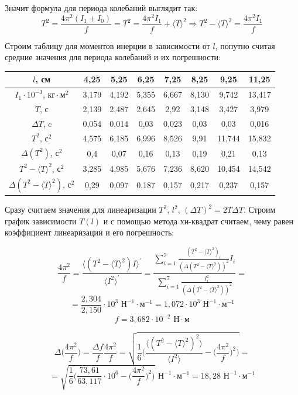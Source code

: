 \documentclass[a4paper, 12pt]{article} %
\begin{document}
Значит формула для периода колебаний выглядит так:
\[T^2 = \frac{4\pi^2 (I_1 + I_0)}{f} = T^2 = \frac{4\pi^2 I_1}{f} + \langle T \rangle^2 \Rightarrow T^2 - \langle T \rangle^2 = \frac{4\pi^2 I_1}{f}\]

Строим таблицу для моментов инерции в зависимости от $l$, попутно считая средние значения для периода колебаний и их погрешности:\\

\begin{center}
\begin{tabular}{|c|c|c|c|c|c|c|c|}
\hline 
$l$, см & 4,25 & 5,25 & 6,25 & 7,25 & 8,25 & 9,25 & 11,25 \\ 
\hline 
$I_1 \cdot 10^{-3}$, $\text{кг} \cdot \text{м}^2$  & 3,179 & 4,192 & 5,355 & 6,667 & 8,130 & 9,742 & 13,417 \\ 
\hline 
$T$, с & 2,139 & 2,487 & 2,645 & 2,92 & 3,148 & 3,427 & 3,979 \\ 
\hline 
$\Delta T$, c & 0,054 & 0,014 & 0,03 & 0,023 & 0,03 & 0,03 & 0,016 \\ 
\hline
$T^2$, $\text{с}^2$ & 4,575 & 6,185 & 6,996 & 8,526 & 9,91 & 11,744 & 15,832 \\ 
\hline 
$\Delta (T^2)$, $\text{с}^2$ & 0,4 & 0,07 & 0,16 & 0,13 & 0,19 & 0,21 & 0,13 \\ 
\hline 
$T^2 - \langle T \rangle^2$, $\text{с}^2$ & 3,285 & 4,985 & 5,676 & 7,236 & 8,620 & 10,454 & 14,542 \\ 
\hline 
$\Delta (T^2 - \langle T \rangle^2)$, $\text{с}^2$ & 0,29 & 0,097 & 0,187 & 0,157 & 0,217 & 0,237 & 0,157 \\ 
\hline 
\end{tabular}
\end{center}   

Сразу считаем значения для линеаризации $T^2$, $l^2$, $(\Delta T)^2 = 2 T \Delta T$. Строим график зависимости $T(l)$ и с помощью метода хи-квадрат считаем, чему равен коэффициент линеаризации и его погрешность:

\[\frac{4\pi^2}{f} = \frac{\langle (T^2 - \langle T \rangle^2) I \rangle^{'}}{\langle I^2 \rangle^{'}} = \frac{\sum_{i = 1}^{7} \frac{(T^2 - \langle T \rangle^2)_i}{(\Delta (T^2 - \langle T \rangle^2))^2} I_i}{\sum_{i = 1}^{7} \frac{I^2_i}{(\Delta (T^2 - \langle T \rangle^2))^2}} = \]
\[= \frac{2,304}{2,150} \cdot 10^{3} \text{ Н}^{-1} \cdot \text{м}^{-1} = 1,072 \cdot 10^3 \text{ Н}^{-1} \cdot \text{м}^{-1}\]
\[f = 3,682 \cdot 10^{-2}\text{ Н} \cdot \text{м}\]

\[\Delta \Big(\frac{4\pi^2}{f}\Big) =  \frac{\Delta f}{f} \frac{4\pi^2}{f} = \sqrt{\frac{1}{6}\Big( \frac{\langle (T^2 - \langle T \rangle^2)^2 \rangle}{\langle I^2 \rangle} - \Big(\frac{4\pi^2}{f}\Big)^2\Big)} = \]
\[= \sqrt{\frac{1}{6}\Big( \frac{73,61}{63,117} \cdot 10^6 - \Big(\frac{4\pi^2}{f}\Big)^2\Big)} \text{ Н}^{-1} \cdot \text{м}^{-1} = 18,28 \text{ Н}^{-1} \cdot \text{м}^{-1}\]
\end{document}
